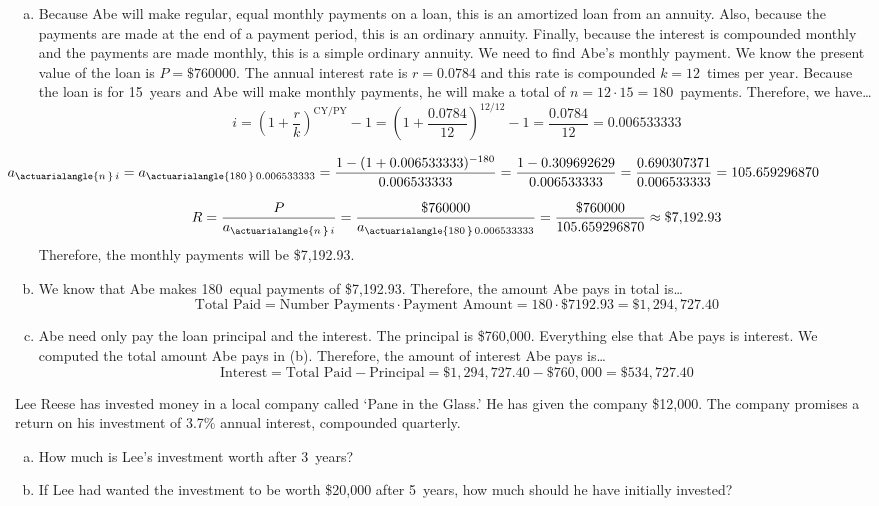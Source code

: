 \documentclass[12pt,letterpaper]{exam}
\begin{document}
\begin{questions}
{\itshape
\sol 
\begin{enumerate}[(a)]
\item Because Abe will make regular, equal monthly payments on a loan, this is an amortized loan from an annuity. Also, because the payments are made at the end of a payment period, this is an ordinary annuity. Finally, because the interest is compounded monthly and the payments are made monthly, this is a simple ordinary annuity. We need to find Abe's monthly payment. We know the present value of the loan is $P= \$760000$. The annual interest rate is $r= 0.0784$ and this rate is compounded $k= 12$~times per year. Because the loan is for 15~years and Abe will make monthly payments, he will make a total of $n= 12 \cdot 15= 180$~payments. Therefore, we have\dots
	\[
	i= \left(1 + \dfrac{r}{k} \right)^{\text{CY}/\text{PY}} - 1= \left(1 + \dfrac{0.0784}{12} \right)^{12/12} - 1= \dfrac{0.0784}{12}= 0.006533333
	\] \par\vspace{0.1cm}
	\[
	\hspace{-2.2cm} a_{\actuarialangle{n\,}\, i}= a_{\actuarialangle{180\,}\, 0.006533333}= \dfrac{1 - (1 + 0.006533333)^{-180}}{0.006533333}= \dfrac{1 - 0.309692629}{0.006533333}= \dfrac{0.690307371}{0.006533333}= 105.659296870
	\] \par\vspace{0.1cm}
	\[
	R= \dfrac{P}{a_{\actuarialangle{n\,}\, i}}= \dfrac{\$760000}{a_{\actuarialangle{180\,}\, 0.006533333}}= \dfrac{\$760000}{105.659296870} \approx \$7,\!192.93
	\]
Therefore, the monthly payments will be \$7,192.93. \pspace

\item We know that Abe makes 180~equal payments of \$7,192.93. Therefore, the amount Abe pays in total is\dots
	\[
	\text{Total Paid}= \text{Number Payments} \cdot \text{Payment Amount}= 180 \cdot \$7192.93= \$1,\!294,\!727.40
	\]

\item Abe need only pay the loan principal and the interest. The principal is \$760,000. Everything else that Abe pays is interest. We computed the total amount Abe pays in (b). Therefore, the amount of interest Abe pays is\dots
	\[
	\text{Interest}= \text{Total Paid} - \text{Principal}= \$1,\!294,\!727.40 - \$760,\!000= \$534,\!727.40
	\]
\end{enumerate}
}



\newpage
\question[10] Lee Reese has invested money in a local company called `Pane in the Glass.' He has given the company \$12,000. The company promises a return on his investment of 3.7\% annual interest, compounded quarterly. 
	\begin{enumerate}[(a)]
	\item How much is Lee's investment worth after 3~years?
	\item If Lee had wanted the investment to be worth \$20,000 after 5~years, how much should he have initially invested? 
	\end{enumerate} \pspace


\end{questions}
\end{document}
